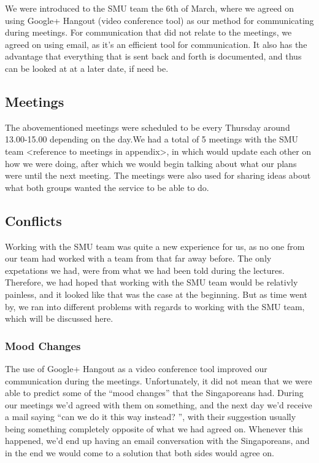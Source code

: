We were introduced to the SMU team the 6th of March, where we agreed on using Google+ Hangout (video conference tool) as our method for communicating during meetings. For communication that did not relate to the meetings, we agreed on using email, as it's an efficient tool for communication. It also has the advantage that everything that is sent back and forth is documented, and thus can be looked at at a later date, if need be.

\subsection{Meetings}
\label{Collaboration_SMU_Meetings}
The abovementioned meetings were scheduled to be every Thursday around 13.00-15.00 depending on the day.We had a total of 5 meetings with the SMU team <reference to meetings in appendix>, in which would update each other on how we were doing, after which we would begin talking about what our plans were until the next meeting. The meetings were also used for sharing ideas about what both groups wanted the service to be able to do.

\subsection{Conflicts}
\label{Collaboration_SMU_Conflicts}
Working with the SMU team was quite a new experience for us, as no one from our team had worked with a team from that far away before. The only expetations we had, were from what we had been told during the lectures. Therefore, we had hoped that working with the SMU team would be relativly painless, and it looked like that was the case at the beginning. But as time went by, we ran into different problems with regards to working with the SMU team, which will be discussed here.

\subsubsection{Mood Changes}
\label{Collaboration_SMU_ConflictsMood}
The use of Google+ Hangout as a video conference tool improved our communication during the meetings. Unfortunately, it did not mean that we were able to predict some of the ``mood changes'' that the Singaporeans had. During our meetings we'd agreed with them on something, and the next day we'd receive a mail saying ``can we do it this way instead? '', with their suggestion usually being something completely opposite of what we had agreed on. Whenever this happened, we'd end up having an email conversation with the Singaporeans, and in the end we would come to a solution that both sides would agree on.


